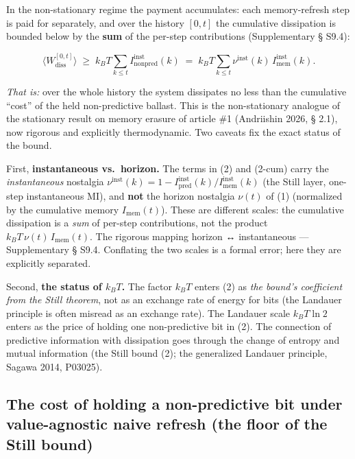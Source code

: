 \documentclass[pdflatex,sn-mathphys-ay]{sn-jnl}
\begin{document}
In the non-stationary regime the payment accumulates: each memory-refresh step is paid for separately, and over the history \([0,t]\) the cumulative dissipation is bounded below by the \textbf{sum} of the per-step contributions (Supplementary § S9.4):



\begin{equation}\Big\langle W_{\text{diss}}^{[0,t]}\Big\rangle \;\ge\; k_B T \sum_{k \le t} I_{\text{nonpred}}^{\text{inst}}(k) \;=\; k_B T \sum_{k \le t} \nu^{\text{inst}}(k)\, I_{\text{mem}}^{\text{inst}}(k). \tag{2-cum}\end{equation}



\emph{That is:} over the whole history the system dissipates no less than the cumulative ``cost'' of the held non-predictive ballast. This is the non-stationary analogue of the stationary result on memory erasure of article \#1 (Andriishin 2026, § 2.1), now rigorous and explicitly thermodynamic. Two caveats fix the exact status of the bound.



First, \textbf{instantaneous vs.~horizon.} The terms in (2) and (2-cum) carry the \emph{instantaneous} nostalgia \(\nu^{\text{inst}}(k) = 1 - I_{\text{pred}}^{\text{inst}}(k)/I_{\text{mem}}^{\text{inst}}(k)\) (the Still layer, one-step instantaneous MI), and \textbf{not} the horizon nostalgia \(\nu(t)\) of (1) (normalized by the cumulative memory \(I_{\text{mem}}(t)\)). These are different scales: the cumulative dissipation is a \emph{sum} of per-step contributions, not the product \(k_B T\, \nu(t)\, I_{\text{mem}}(t)\). The rigorous mapping horizon ↔ instantaneous --- Supplementary § S9.4. Conflating the two scales is a formal error; here they are explicitly separated.



Second, \textbf{the status of \(k_B T\).} The factor \(k_B T\) enters (2) as \emph{the bound's coefficient from the Still theorem}, not as an exchange rate of energy for bits (the Landauer principle is often misread as an exchange rate). The Landauer scale \(k_B T \ln 2\) enters as the price of holding one non-predictive bit in (2). The connection of predictive information with dissipation goes through the change of entropy and mutual information (the Still bound (2); the generalized Landauer principle, Sagawa 2014, P03025).



\subsection{The cost of holding a non-predictive bit under value-agnostic naive refresh (the floor of the Still bound)}\label{the-cost-of-holding-a-non-predictive-bit-under-value-agnostic-naive-refresh-the-floor-of-the-still-bound}
\end{document}
